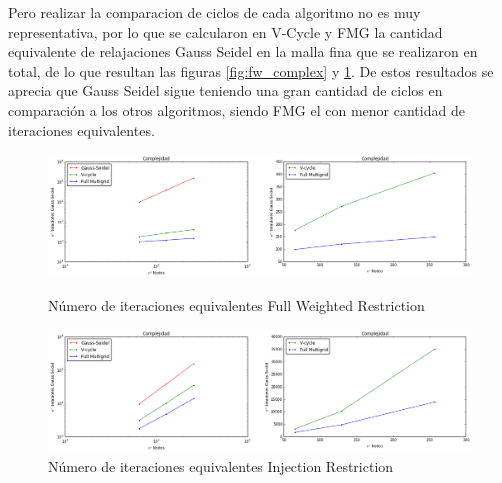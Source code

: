 \documentclass[letter, 10pt]{article}
\begin{document}
Pero realizar la comparacion de ciclos de cada algoritmo no es muy representativa, por lo que se calcularon en V-Cycle y FMG la cantidad equivalente de relajaciones Gauss Seidel en la malla fina que se realizaron en total, de lo que resultan las figuras \ref{fig:fw_complex} y \ref{fig:complex}. De estos resultados se aprecia que Gauss Seidel sigue teniendo una gran cantidad de ciclos en comparación a los otros algoritmos, siendo FMG el con menor cantidad de iteraciones equivalentes.

\begin{figure}[H]
    \centering
    \includegraphics[scale=0.4]{fw_complex.png}
    \caption{Número de iteraciones equivalentes Full Weighted Restriction}
    \label{fig:fw_complex}
    \includegraphics[scale=0.4]{injection_complex.png}
    \caption{Número de iteraciones equivalentes Injection Restriction}
    \label{fig:complex}
\end{figure}
\end{document}
